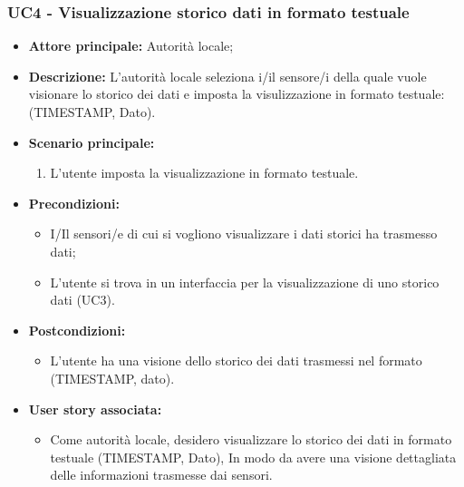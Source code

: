 \subsubsection{UC4 - Visualizzazione storico dati in formato testuale}
\begin{itemize}
    \item \textbf{Attore principale:} Autorità locale;
    \item \textbf{Descrizione:} L’autorità locale seleziona i/il sensore/i della quale vuole visionare lo storico dei dati e imposta la visulizzazione in formato testuale: (TIMESTAMP, Dato).
    \item \textbf{Scenario principale:}
          \begin{enumerate}
              \item L'utente imposta la visualizzazione in formato testuale.
          \end{enumerate}
    \item \textbf{Precondizioni:}
          \begin{itemize}
              \item  I/Il sensori/e di cui si vogliono visualizzare i dati storici ha trasmesso dati;
              \item  L'utente si trova in un interfaccia per la visualizzazione di uno storico dati (UC3).
          \end{itemize}
    \item \textbf{Postcondizioni:}
          \begin{itemize}
              \item  L'utente ha una visione dello storico dei dati trasmessi nel formato (TIMESTAMP, dato).
          \end{itemize}
    \item \textbf{User story associata:}
          \begin{itemize}
              \item Come autorità locale,
                    desidero visualizzare lo storico dei dati in formato testuale (TIMESTAMP, Dato),
                    In modo da avere una visione dettagliata delle informazioni trasmesse dai sensori.
          \end{itemize}
\end{itemize}